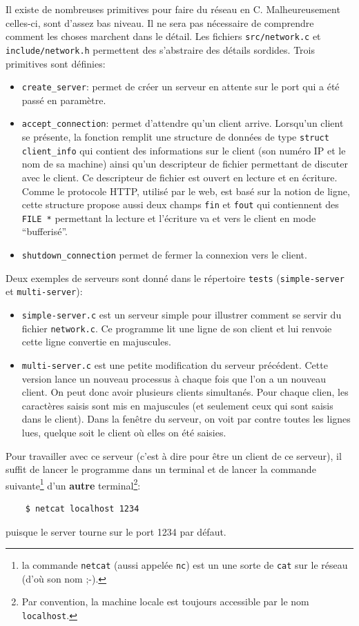 \documentclass[10pt,a4paper]{article}
\begin{document}
Il existe de nombreuses primitives pour faire du réseau en C.
Malheureusement celles-ci, sont d'assez bas niveau. Il ne sera pas
nécessaire de comprendre comment les choses marchent dans le détail.
Les fichiers \texttt{src/network.c} et \texttt{include/network.h}
permettent des s'abstraire des détails sordides. Trois primitives sont
définies:
\begin{itemize}
\item \texttt{create\_server}: permet de créer un serveur en
  attente sur le port qui a été passé en paramètre.
\item \texttt{accept\_connection}: permet d'attendre qu'un client
  arrive.  Lorsqu'un client se présente, la fonction remplit une
  structure de données de type \texttt{struct client\_info} qui contient
  des informations sur le client (son numéro IP et le nom de sa
  machine) ainsi qu'un descripteur de fichier permettant de discuter
  avec le client. Ce descripteur de fichier est ouvert en lecture et
  en écriture. Comme le protocole HTTP, utilisé par le web, est basé
  sur la notion de ligne, cette structure propose aussi deux champs
  \texttt{fin} et \texttt{fout} qui contiennent des \texttt{FILE *}
  permettant la lecture et l'écriture va et vers le client en mode
  ``bufferisé''.
\item \texttt{shutdown\_connection} permet de fermer la connexion vers
  le client.
\end{itemize}

Deux exemples de serveurs sont donné dans le répertoire \texttt{tests}
(\texttt{simple-server} et \texttt{multi-server}):
\begin{itemize}
\item \texttt{simple-server.c} est un serveur simple pour illustrer
  comment se servir du fichier \texttt{network.c}. Ce programme lit
  une ligne de son client et lui renvoie cette ligne convertie en
  majuscules.
\item \texttt{multi-server.c} est une petite modification du serveur
  précédent. Cette version lance un nouveau processus à chaque fois
  que l'on a un nouveau client. On peut donc avoir plusieurs clients
  simultanés. Pour chaque clien, les caractères saisis sont mis en
  majuscules (et seulement ceux qui sont saisis dans le client).  Dans
  la fenêtre du serveur, on voit par contre toutes les lignes lues,
  quelque soit le client où elles on été saisies.
\end{itemize}


Pour travailler avec ce serveur (c'est à dire pour être un client de ce serveur), il suffit de lancer le programme dans
un terminal et de lancer la commande suivante\footnote{la commande
  \texttt{netcat} (aussi appelée \texttt{nc}) est un une sorte de
  \texttt{cat} sur le réseau (d'où son nom ;-).} d'un \textbf{autre}
terminal\footnote{Par convention, la machine locale est toujours
  accessible par le nom \texttt{localhost}.}:
\begin{verbatim}
    $ netcat localhost 1234
\end{verbatim}
puisque le server tourne sur le port 1234 par défaut.
\end{document}
